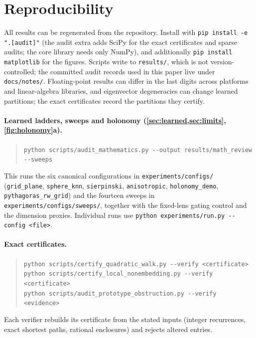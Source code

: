 \section{Reproducibility}
\label{app:reproducibility}

All results can be regenerated from the repository.
Install with \texttt{pip install -e ".[audit]"} (the audit extra adds SciPy for the exact certificates and sparse audits; the core library needs only NumPy), and additionally \texttt{pip install matplotlib} for the figures.
Scripts write to \texttt{results/}, which is not version-controlled; the committed audit records used in this paper live under \texttt{docs/notes/}.
Floating-point results can differ in the last digits across platforms and linear-algebra libraries, and eigenvector degeneracies can change learned partitions; the exact certificates record the partitions they certify.

\paragraph{Learned ladders, sweeps and holonomy (\cref{sec:learned,sec:limits}, \cref{fig:holonomy}a).}
\begin{quote}\small
\texttt{python scripts/audit\_mathematics.py -{}-output results/math\_review -{}-sweeps}
\end{quote}
This runs the six canonical configurations in \texttt{experiments/configs/} (\texttt{grid\_plane}, \texttt{sphere\_knn}, \texttt{sierpinski}, \texttt{anisotropic}, \texttt{holonomy\_demo}, \texttt{pythagoras\_rw\_grid}) and the fourteen sweeps in \texttt{experiments/configs/sweeps/}, together with the fixed-lens gating control and the dimension proxies.
Individual runs use \texttt{python experiments/run.py -{}-config <file>}.

\paragraph{Exact certificates.}
\begin{quote}\small
\texttt{python scripts/certify\_quadratic\_walk.py -{}-verify <certificate>}\\
\texttt{python scripts/certify\_local\_nonembedding.py -{}-verify <certificate>}\\
\texttt{python scripts/audit\_prototype\_obstruction.py -{}-verify <evidence>}
\end{quote}
Each verifier rebuilds its certificate from the stated inputs (integer recurrences, exact shortest paths, rational enclosures) and rejects altered entries.

